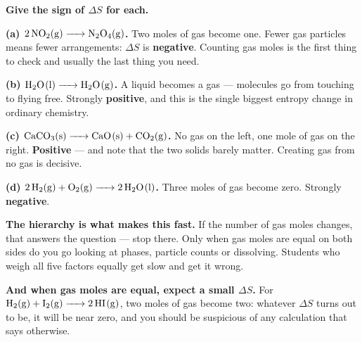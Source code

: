 \documentclass{apchem-worksheet}
\begin{document}
\begin{center}
\end{center}

\begin{workedexample}
\textbf{Give the sign of $\Delta S$ for each.}

\textbf{(a) $\ce{2NO2(g) -> N2O4(g)}$.} Two moles of gas become one.
Fewer gas particles means fewer arrangements: $\Delta S$ is
\textbf{negative}. Counting gas moles is the first thing to check and
usually the last thing you need.

\textbf{(b) $\ce{H2O(l) -> H2O(g)}$.} A liquid becomes a gas ---
molecules go from touching to flying free. Strongly \textbf{positive},
and this is the single biggest entropy change in ordinary chemistry.

\textbf{(c) $\ce{CaCO3(s) -> CaO(s) + CO2(g)}$.} No gas on the left,
one mole of gas on the right. \textbf{Positive} --- and note that the
two solids barely matter. Creating gas from no gas is decisive.

\textbf{(d) $\ce{2H2(g) + O2(g) -> 2H2O(l)}$.} Three moles of gas
become zero. Strongly \textbf{negative}.

\textbf{The hierarchy is what makes this fast.} If the number of gas
moles changes, that answers the question --- stop there. Only when gas
moles are equal on both sides do you go looking at phases, particle
counts or dissolving. Students who weigh all five factors equally get
slow and get it wrong.

\textbf{And when gas moles are equal, expect a small $\Delta S$.} For
$\ce{H2(g) + I2(g) -> 2HI(g)}$, two moles of gas become two: whatever
$\Delta S$ turns out to be, it will be near zero, and you should be
suspicious of any calculation that says otherwise.
\end{workedexample}
\end{document}
